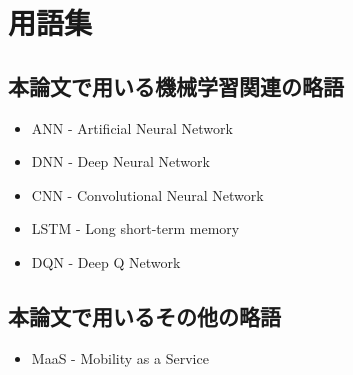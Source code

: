 \chapter{用語集}


\section{本論文で用いる機械学習関連の略語}

\begin{itemize}
    \item ANN   - Artificial Neural Network
    \item DNN   - Deep Neural Network
    \item CNN   - Convolutional Neural Network
    \item LSTM  - Long short-term memory
    \item DQN   - Deep Q Network
\end{itemize}


\section{本論文で用いるその他の略語}

\begin{itemize}
    \item MaaS - Mobility as a Service
\end{itemize}
